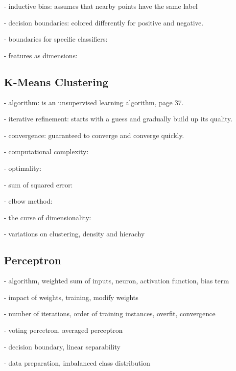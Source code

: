\documentclass[12pt,letterpaper]{article}
\begin{document}
- inductive bias: assumes that nearby points have the same label

- decision boundaries: colored differently for positive and negative.

- boundaries for specific classifiers:

- features as dimensions:

\subsection*{K-Means Clustering}

- algorithm: is an unsupervised learning algorithm, page 37.

- iterative refinement: starts with a guess and gradually build up its
quality.

- convergence: guaranteed to converge and converge quickly.

- computational complexity:

- optimality:

- sum of squared error:

- elbow method:

- the curse of dimensionality:

- variations on clustering, density and hierachy

\subsection*{Perceptron}

- algorithm, weighted sum of inputs, neuron, activation function, bias term

- impact of weights, training, modify weights

- number of iterations, order of training instances, overfit, convergence

- voting percetron, averaged perceptron

- decision boundary, linear separability

- data preparation, imbalanced class distribution
\end{document}
